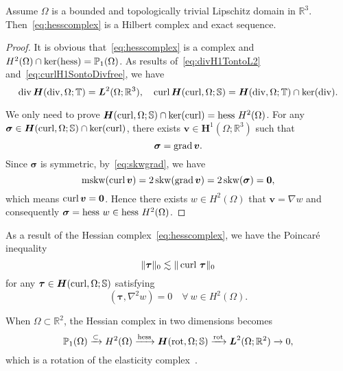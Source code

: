 \begin{theorem}\label{thm:hessiancomplex}
Assume $\Omega$  is a bounded and topologically trivial Lipschitz domain in $\mathbb R^3$. Then~\eqref{eq:hesscomplex} is a Hilbert complex and  exact sequence.   
\end{theorem}
\begin{proof}
It is obvious that~\eqref{eq:hesscomplex} is a complex and $H^{2}(\Omega)\cap\ker(\operatorname{hess})=\mathbb P_1(\Omega)$.
As results of~\eqref{eq:divH1TontoL2} and~\eqref{eq:curlH1SontoDivfree}, we have
\[
\operatorname{div}\boldsymbol H(\operatorname{div}, \Omega;\mathbb T)=\boldsymbol L^2(\Omega; \mathbb R^3),\quad \operatorname{curl}\boldsymbol H(\operatorname{curl}, \Omega;\mathbb S)=\boldsymbol H(\operatorname{div}, \Omega;\mathbb T)\cap\ker(\operatorname{div}).
\]

We only need to prove $\boldsymbol H(\operatorname{curl}, \Omega;\mathbb S)\cap\ker(\operatorname{curl})=\operatorname{hess}\,H^2(\Omega)$.
For any $\boldsymbol\sigma\in\boldsymbol H(\operatorname{curl}, \Omega;\mathbb S)\cap\ker(\operatorname{curl})$, there exists $\boldsymbol v \in\boldsymbol H^1(\Omega;\mathbb R^3)$ such that
\[
\boldsymbol\sigma=\operatorname{grad}\boldsymbol v.
\]
Since $\boldsymbol\sigma$ is symmetric, by~\eqref{eq:skwgrad}, we have
\[
\operatorname{mskw}(\operatorname{curl}\boldsymbol v)=2\operatorname{skw}(\operatorname{grad}\boldsymbol v)=2\operatorname{skw}(\boldsymbol\sigma)=\boldsymbol0,
\]
which means $\operatorname{curl}\boldsymbol v=\boldsymbol0$. Hence there exists $w\in H^2(\Omega)$ that $\boldsymbol v=\nabla w$ and consequently $\boldsymbol\sigma=\operatorname{hess}\,w\in\operatorname{hess}\,H^2(\Omega)$.
\end{proof}

As a result of the Hessian complex~\eqref{eq:hesscomplex}, we have the Poincar\'e inequality~\cite[the inequality above (14)]{ArnoldHu2020}
\begin{equation}\label{eq:Poincareieqlity}
\|\boldsymbol\tau\|_0\lesssim \|\operatorname{curl} \, \boldsymbol\tau\|_0
\end{equation}
for any $\boldsymbol\tau\in\boldsymbol H(\operatorname{curl}, \Omega;\mathbb S)$ satisfying
\[
(\boldsymbol\tau,\nabla^2w)=0\quad\forall~w\in H^2(\Omega).
\]


When $\Omega\subset\mathbb R^2$,
the Hessian complex in two dimensions becomes
\begin{equation*}%
\mathbb P_1(\Omega)\xrightarrow{\subset} H^{2}(\Omega)\xrightarrow{\hess}\boldsymbol H(\rot, \Omega;\mathbb S)\xrightarrow{\rot}  \boldsymbol L^2(\Omega;\mathbb R^2)\xrightarrow{}0,
\end{equation*}
which is a rotation of the elasticity complex~\cite{Eastwood2000,ArnoldWinther2002}.


